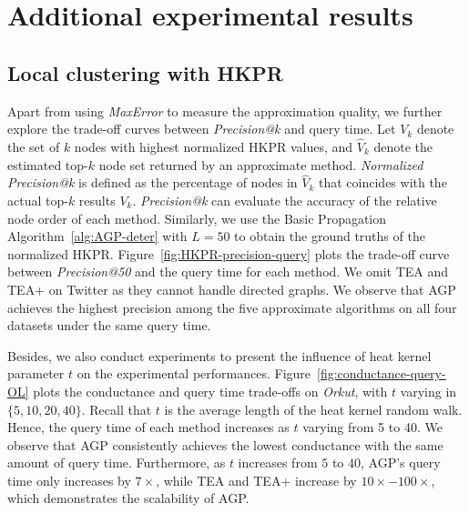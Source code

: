 


\section{Additional experimental results} \label{sec:appendix_old}
\subsection{Local clustering with HKPR}
Apart from using {\em MaxError} to measure the approximation quality, we further explore the trade-off curves between {\em Precision@k} and query time. 
Let $V_k$ denote the set of $k$ nodes with highest normalized HKPR values, and $\hat{V}_k$ denote the estimated top-$k$ node set returned by an approximate method. {\em Normalized Precision@k} is defined as the percentage of nodes in $\hat{V}_k$ that coincides with the actual top-$k$ results $V_k$. {\em Precision@k} can evaluate the accuracy of the relative node order of each method. Similarly, we use the Basic Propagation Algorithm~\ref{alg:AGP-deter} with $L=50$ to obtain the ground truths of the normalized HKPR. %
Figure~\ref{fig:HKPR-precision-query} plots the trade-off curve between {\em Precision@50} and the query time for each method. We omit TEA and TEA+ on Twitter as they cannot handle directed graphs. We observe that AGP achieves the highest precision among the five approximate algorithms on all four datasets under the same query time. 

Besides, we also conduct experiments to present the influence of heat kernel parameter $t$ on the experimental performances. Figure~\ref{fig:conductance-query-OL} plots the conductance and query time trade-offs on {\em Orkut}, with $t$ varying in $\{5,10,20,40\}$. Recall that $t$ is the average length of the heat kernel random walk. Hence, the query time of each method increases as $t$ varying from 5 to 40.  We observe that AGP consistently achieves the lowest conductance with the same amount of query time. Furthermore, as $t$ increases from $5$ to $40$, AGP's query time only increases by $7\times$, while TEA and TEA+ increase by $10\times-100\times$, which demonstrates the scalability of AGP. 

